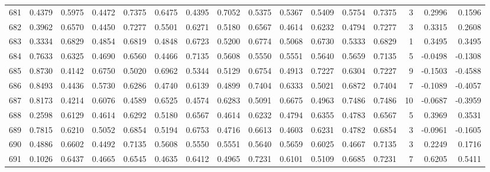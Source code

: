 \begin{tabular}{lrrrrrrrrrrrrrrr}
681 &      0.4379 &  0.5975 &  0.4472 &  0.7375 &  0.6475 &  0.4395 &  0.7052 &  0.5375 &  0.5367 &  0.5409 &   0.5754 &     0.7375 &      3 &                    0.2996 &                     0.1596 \\
682 &      0.3962 &  0.6570 &  0.4450 &  0.7277 &  0.5501 &  0.6271 &  0.5180 &  0.6567 &  0.4614 &  0.6232 &   0.4794 &     0.7277 &      3 &                    0.3315 &                     0.2608 \\
683 &      0.3334 &  0.6829 &  0.4854 &  0.6819 &  0.4848 &  0.6723 &  0.5200 &  0.6774 &  0.5068 &  0.6730 &   0.5333 &     0.6829 &      1 &                    0.3495 &                     0.3495 \\
684 &      0.7633 &  0.6325 &  0.4690 &  0.6560 &  0.4466 &  0.7135 &  0.5608 &  0.5550 &  0.5551 &  0.5640 &   0.5659 &     0.7135 &      5 &                   -0.0498 &                    -0.1308 \\
685 &      0.8730 &  0.4142 &  0.6750 &  0.5020 &  0.6962 &  0.5344 &  0.5129 &  0.6754 &  0.4913 &  0.7227 &   0.6304 &     0.7227 &      9 &                   -0.1503 &                    -0.4588 \\
686 &      0.8493 &  0.4436 &  0.5730 &  0.6286 &  0.4740 &  0.6139 &  0.4899 &  0.7404 &  0.6333 &  0.5021 &   0.6872 &     0.7404 &      7 &                   -0.1089 &                    -0.4057 \\
687 &      0.8173 &  0.4214 &  0.6076 &  0.4589 &  0.6525 &  0.4574 &  0.6283 &  0.5091 &  0.6675 &  0.4963 &   0.7486 &     0.7486 &     10 &                   -0.0687 &                    -0.3959 \\
688 &      0.2598 &  0.6129 &  0.4614 &  0.6292 &  0.5180 &  0.6567 &  0.4614 &  0.6232 &  0.4794 &  0.6355 &   0.4783 &     0.6567 &      5 &                    0.3969 &                     0.3531 \\
689 &      0.7815 &  0.6210 &  0.5052 &  0.6854 &  0.5194 &  0.6753 &  0.4716 &  0.6613 &  0.4603 &  0.6231 &   0.4782 &     0.6854 &      3 &                   -0.0961 &                    -0.1605 \\
690 &      0.4886 &  0.6602 &  0.4492 &  0.7135 &  0.5608 &  0.5550 &  0.5551 &  0.5640 &  0.5659 &  0.6025 &   0.4667 &     0.7135 &      3 &                    0.2249 &                     0.1716 \\
691 &      0.1026 &  0.6437 &  0.4665 &  0.6545 &  0.4635 &  0.6412 &  0.4965 &  0.7231 &  0.6101 &  0.5109 &   0.6685 &     0.7231 &      7 &                    0.6205 &                     0.5411 \\

\end{tabular}
